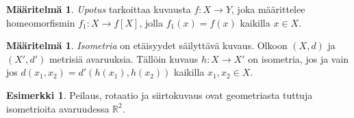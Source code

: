 \documentclass[12pt,a4paper,leqno]{report}
\newcommand{\R}{\mathbb{R}}
\theoremstyle{plain}
\newtheorem{lem}[equation]{Lemma}
\theoremstyle{definition}
\newtheorem{maar}[equation]{Määritelmä}
\newtheorem{esim}[equation]{Esimerkki}
\theoremstyle{remark}
\begin{document}
\begin{maar}\emph{Upotus} 
tarkoittaa kuvausta $f\colon X\rightarrow Y$, joka määrittelee homeomorfismin $f_1\colon X\rightarrow f[X]$, jolla $f_1(x)=f(x)$ kaikilla $x\in X$. %
\end{maar}
\begin{maar}\emph{Isometria}
 on etäisyydet säilyttävä kuvaus. Olkoon $(X,d)$ ja $(X',d')$ metrisiä avaruuksia. %
Tällöin kuvaus $h\colon X\rightarrow X'$ on isometria, jos ja vain jos $d(x_1,x_2)=d'(h(x_1),h(x_2))$ kaikilla $x_1,x_2 \in X$.
\end{maar}
%
\begin{esim}
Peilaus, rotaatio ja siirtokuvaus ovat geometriasta tuttuja isometrioita avaruudessa $\R^2$.
\end{esim}
\end{document}

